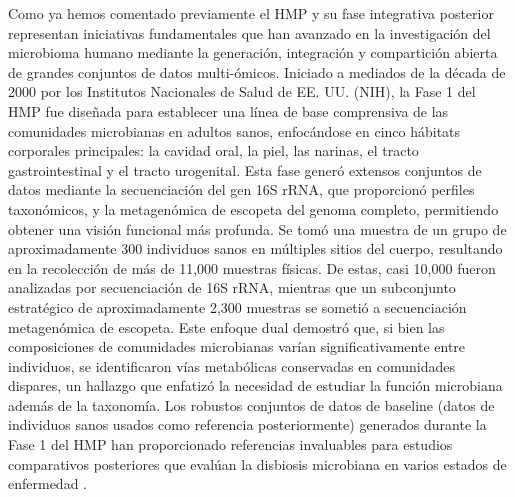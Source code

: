 Como ya hemos comentado previamente el HMP y su fase integrativa posterior representan iniciativas fundamentales que han avanzado en la investigación del microbioma humano mediante la generación, integración y compartición abierta de grandes conjuntos de datos multi-ómicos. Iniciado a mediados de la década de 2000 por los Institutos Nacionales de Salud de EE. UU. (NIH), la Fase 1 del HMP fue diseñada para establecer una línea de base comprensiva de las comunidades microbianas en adultos sanos, enfocándose en cinco hábitats corporales principales: la cavidad oral, la piel, las narinas, el tracto gastrointestinal y el tracto urogenital. Esta fase generó extensos conjuntos de datos mediante la secuenciación del gen 16S rRNA, que proporcionó perfiles taxonómicos, y la metagenómica de escopeta del genoma completo, permitiendo obtener una visión funcional más profunda. Se tomó una muestra de un grupo de aproximadamente 300 individuos sanos en múltiples sitios del cuerpo, resultando en la recolección de más de 11,000 muestras físicas. De estas, casi 10,000 fueron analizadas por secuenciación de 16S rRNA, mientras que un subconjunto estratégico de aproximadamente 2,300 muestras se sometió a secuenciación metagenómica de escopeta. Este enfoque dual demostró que, si bien las composiciones de comunidades microbianas varían significativamente entre individuos, se identificaron vías metabólicas conservadas en comunidades dispares, un hallazgo que enfatizó la necesidad de estudiar la función microbiana además de la taxonomía. Los robustos conjuntos de datos de baseline (datos de individuos sanos usados como referencia posteriormente) generados durante la Fase 1 del HMP han proporcionado referencias invaluables para estudios comparativos posteriores que evalúan la disbiosis microbiana en varios estados de enfermedad \cite{aagaard2013human}.

